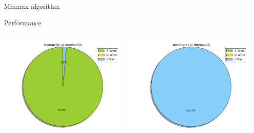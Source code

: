 \documentclass[aspectratio=169]{beamer}
\begin{document}
\begin{frame}{Minmax algorithm}
	
\lstMinMax
\end{frame}

\begin{frame}{Performance}
	 \begin{columns}
	 	\begin{column}{0.5\textwidth}
	 		\centering
	 		\includegraphics[scale =0.35]{minmax_random.png}
	 	\end{column}
	 	\begin{column}{0.5\textwidth}
	 		\centering
	 		\includegraphics[scale =0.35]{minmax_minmax.png}
	 	\end{column}
	 \end{columns}
\end{frame}
\end{document}

